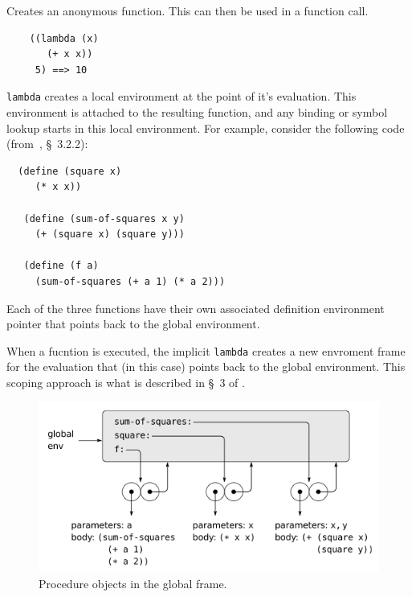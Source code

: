 \documentclass[12pt]{article}
\begin{document}
Creates an anonymous function. This can then be used in a function call.

\begin{verbatim}
    ((lambda (x) 
       (+ x x)) 
     5) ==> 10
\end{verbatim}

\verb|lambda| creates a local environment at the point of it's
evaluation. This environment is attached to the resulting function,
and any binding or symbol lookup starts in this local environment. For
example, consider the following code (from~\cite{sicp}, \S~3.2.2):

\begin{verbatim}
  (define (square x)
     (* x x))

   (define (sum-of-squares x y)
     (+ (square x) (square y)))

   (define (f a)
     (sum-of-squares (+ a 1) (* a 2)))
\end{verbatim}

Each of the three functions have their own associated definition
environment pointer that points back to the global environment.

When a fucntion is executed, the implicit \verb|lambda| creates a new
envroment frame for the evaluation that (in this case) points back to
the global environment. This scoping approach is what is described in
\S~3 of \cite{sicp}.

\begin{figure}[htbp] %
   \centering
   \includegraphics[width=5in]{function_declarations.png} 
\caption{Procedure objects in the global frame.}
\label{fig:funcdefs}
\end{figure}
\end{document}
